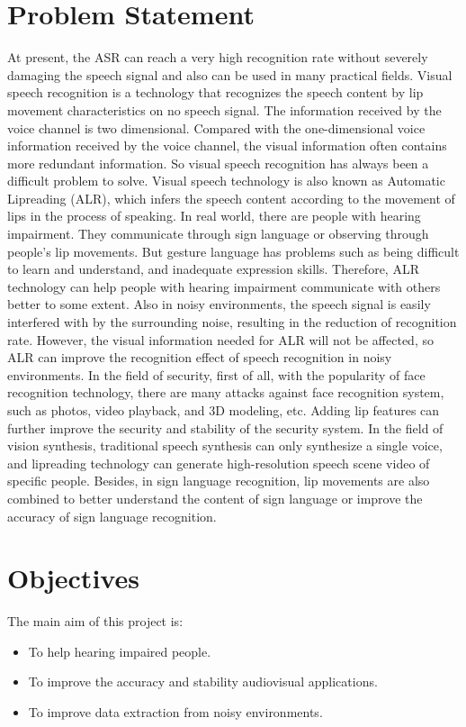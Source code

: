 \section{Problem Statement}
	At present, the ASR can reach a very high recognition rate without severely damaging the speech signal and also can be used in many practical fields. Visual speech recognition is a technology that recognizes the speech content by lip movement characteristics on no speech signal. The information received by the voice channel is two dimensional. Compared with the one-dimensional voice information received by the voice channel, the visual information often contains more redundant information. So visual speech recognition has always been a difficult problem to solve. Visual speech technology is also known as Automatic Lipreading (ALR), which infers the speech content according to the movement of lips in the process of speaking. In real world, there are people with hearing impairment. They communicate through sign language or observing through people’s lip movements. But gesture language has problems such as being difficult to learn and understand, and inadequate expression skills. Therefore, ALR technology can help people with hearing impairment communicate with others better to some extent. Also in noisy environments, the speech signal is easily interfered with by the surrounding noise, resulting in the reduction of recognition rate. However, the visual information needed for ALR will not be affected, so ALR can improve the recognition effect of speech recognition in noisy environments. In the field of security, first of all, with the popularity of face recognition technology, there are many attacks against face recognition system, such as photos, video playback, and 3D modeling, etc. Adding lip features can further improve the security and stability of the security system. In the field of vision synthesis, traditional speech synthesis can only synthesize a single voice, and lipreading technology can generate high-resolution speech scene video of specific people. Besides, in sign language recognition, lip movements are also combined to better understand the content of sign language or improve the accuracy of sign language recognition. 

\section{Objectives}
	The main aim of this project is:
\begin{itemize}
	\item To help hearing impaired people.
	\item To improve the accuracy and stability audiovisual applications. 
	\item To improve data extraction from noisy environments.
\end{itemize}	
	

